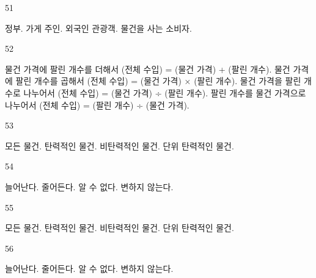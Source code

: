 \documentclass[fs9,seriesFre]{korfarm-base}
\begin{document}
\begin{kfSentenceUnit}{51}{}
\begin{kfChoices}
\kfChoice 정부.
\kfChoice 가게 주인.
\kfChoice 외국인 관광객.
\kfChoice 물건을 사는 소비자.
\end{kfChoices}
\end{kfSentenceUnit}

\begin{kfSentenceUnit}{52}{}
\begin{kfChoices}
\kfChoice 물건 가격에 팔린 개수를 더해서 (전체 수입) = (물건 가격) + (팔린 개수).
\kfChoice 물건 가격에 팔린 개수를 곱해서 (전체 수입) = (물건 가격) × (팔린 개수).
\kfChoice 물건 가격을 팔린 개수로 나누어서 (전체 수입) = (물건 가격) ÷ (팔린 개수).
\kfChoice 팔린 개수를 물건 가격으로 나누어서 (전체 수입) = (팔린 개수) ÷ (물건 가격).
\end{kfChoices}
\end{kfSentenceUnit}

\begin{kfSentenceUnit}{53}{}
\begin{kfChoices}
\kfChoice 모든 물건.
\kfChoice 탄력적인 물건.
\kfChoice 비탄력적인 물건.
\kfChoice 단위 탄력적인 물건.
\end{kfChoices}
\end{kfSentenceUnit}

\begin{kfSentenceUnit}{54}{}
\begin{kfChoices}
\kfChoice 늘어난다.
\kfChoice 줄어든다.
\kfChoice 알 수 없다.
\kfChoice 변하지 않는다.
\end{kfChoices}
\end{kfSentenceUnit}

\begin{kfSentenceUnit}{55}{}
\begin{kfChoices}
\kfChoice 모든 물건.
\kfChoice 탄력적인 물건.
\kfChoice 비탄력적인 물건.
\kfChoice 단위 탄력적인 물건.
\end{kfChoices}
\end{kfSentenceUnit}

\begin{kfSentenceUnit}{56}{}
\begin{kfChoices}
\kfChoice 늘어난다.
\kfChoice 줄어든다.
\kfChoice 알 수 없다.
\kfChoice 변하지 않는다.
\end{kfChoices}
\end{kfSentenceUnit}
\end{document}
